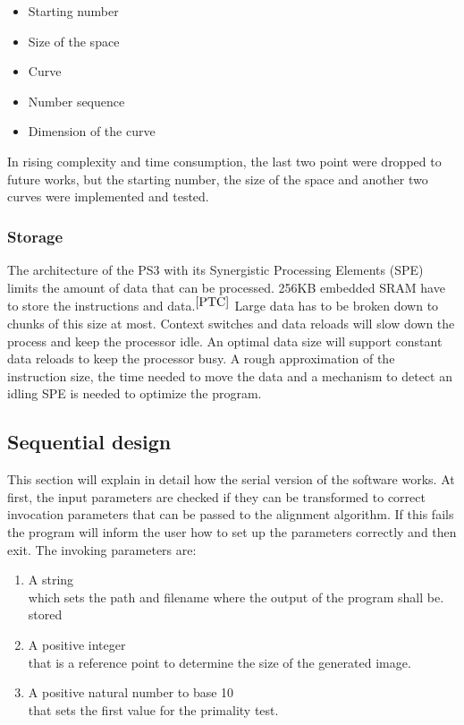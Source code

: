 \begin{itemize}%
   \item Starting number
   \item Size of the space
   \item Curve
   \item Number sequence
   \item Dimension of the curve   
\end{itemize}%

In rising complexity and time consumption, the last two point were dropped to future works, but the starting number, the size of the space and another two curves were implemented and tested.

\subsubsection{Storage}
\label{sec:concurrency}
The architecture of the PS3 with its Synergistic Processing Elements (SPE) limits the amount of data that can be processed. 256KB embedded SRAM have to store the instructions and data.$^{\cite{PTC}}$
Large data has to be broken down to chunks of this size at most. Context switches and data reloads will slow down the process and keep the processor idle. An optimal data size will support constant data reloads to keep the processor busy. A rough approximation of the instruction size, the time needed to move the data and a mechanism to detect an idling SPE is needed to optimize the program.

\subsection{Sequential design}
\label{sec:serial_design}
This section will explain in detail how the serial version of the software works.
At first, the input parameters are checked if they can be transformed to correct invocation parameters that can be passed to the alignment algorithm. If this fails the program will inform the user how to set up the parameters correctly and then exit.
The invoking parameters are:

\begin{enumerate}
   \item A string\\ which sets the path and filename where the output of the program shall be. stored
   \item A positive integer\\ that is a reference point to determine the size of the generated image.
   \item A positive natural number to base 10\\ that sets the first value for the primality test.
\end{enumerate}

